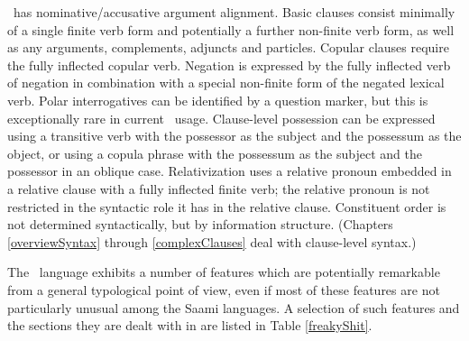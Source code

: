 \PS\ has nominative/accusative argument alignment. 
Basic clauses consist minimally of a single finite verb form and potentially a further non-finite verb form, %
as well as any arguments, complements, adjuncts and particles. Copular clauses require the fully inflected copular verb. Negation is expressed by the fully inflected verb of negation in combination with a special non-finite form of the negated lexical verb. Polar interrogatives can be identified by a question marker, but this is exceptionally rare in current \PS\ usage. Clause-level possession can be expressed using a transitive verb with the possessor as the subject and the possessum as the object, or using a copula phrase with the possessum as the subject and the possessor in an oblique case. Relativization uses a relative pronoun embedded in a relative clause with a fully inflected finite verb; the relative pronoun is not restricted in the syntactic role it has in the relative clause. Constituent order is not determined syntactically, but by information structure. (Chapters \ref{overviewSyntax} through \ref{complexClauses} deal with clause-level syntax.) 

The \PS\ language exhibits a number of features which are potentially remarkable from a general typological point of view, even if most of these features are not particularly unusual among the Saami languages. A selection of such features and the sections they are dealt with in are listed in Table \vref{freakyShit}. 

